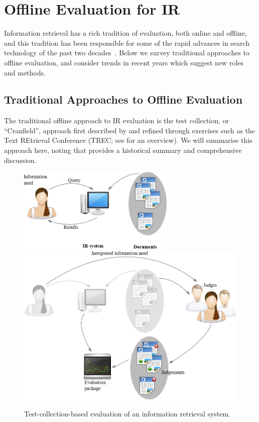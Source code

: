 \documentclass[openany]{now} %
\begin{document}
\section{Offline Evaluation for IR}

Information retrieval has a rich tradition of evaluation, both online and offline, and this tradition has been responsible for some of the rapid advances in search technology of the past two decades~\citep{TRECimpact}. Below we survey traditional approaches to offline evaluation, and consider trends in recent years which suggest new roles and methods.

\subsection{Traditional Approaches to Offline Evaluation}

The traditional offline approach to IR evaluation is the test collection, or ``Cranfield'', approach first described by \cite{cleverdon67} and refined through exercises such as the Text REtrieval Conference (TREC; see \cite{voor:trec05} for an overview).  We will summarise this approach here, noting that \cite{INR-009} provides a historical summary and comprehensive discussion.

\begin{figure}
	{
	\includegraphics[width=0.67\textwidth]{images/ir-model}
	\label{fig:ir-simple}
	}\vspace*{3em}
	{
	\includegraphics[width=\textwidth]{images/ir-model-with-judges}
	\label{fig:ir-with-judges}
	}\vspace*{3em}
	\caption{Test-collection-based evaluation of an information retrieval system.}
\end{figure}
\end{document}
